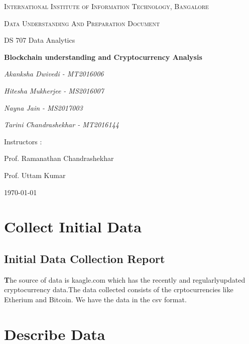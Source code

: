 \documentclass{article}
\begin{document}
\begin{titlepage}
	\centering
	{\scshape\LARGE International Institute of Information Technology, Bangalore \par}
	\vspace{1cm}
	{\scshape\Large Data Understanding And Preparation Document\par}
	{\Large DS 707 Data Analytics\par}
	\vspace{1.5cm}
	{\huge\bfseries Blockchain understanding and Cryptocurrency Analysis\par}
	\vspace{2cm}
	{\Large\itshape Akanksha Dwivedi - MT2016006\par}
	{\Large\itshape Hitesha Mukherjee - MS2016007\par}
	{\Large\itshape Nayna Jain - MS2017003\par}
	{\Large\itshape Tarini Chandrashekhar - MT2016144\par}
	\vfill
	Instructors : \par
	Prof. Ramanathan Chandrashekhar
	\par
	Prof. Uttam Kumar

	\vfill



	{\large \today\par}
\end{titlepage}

\newpage

\tableofcontents



\newpage
\justify

\section{Collect Initial Data}
\subsection{Initial Data Collection Report}
\textbf The source of data is kaagle.com which has the recently and regularlyupdated cryptocurrency data.The data collected consists of the crptocurrencies like Etherium and Bitcoin. We have the data in the csv format. 




\section{Describe Data}
\end{document}
